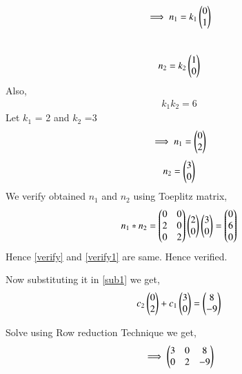 \documentclass[journal,12pt,twocolumn]{IEEEtran}
\begin{document}
\begin{align}
\implies n_1 = k_1\begin{pmatrix}0\\1\end{pmatrix}
\end{align}\\
\begin{align}
n_2 = k_2\begin{pmatrix}1\\0\end{pmatrix}
\end{align}
Also,
\begin{align}
k_1k_2 = 6
\end{align}
Let $k_1$ = 2 and $k_2$ =3
\begin{align}
\implies n_1 = \begin{pmatrix}0\\2\end{pmatrix}
\label{n1}
\end{align}
\begin{align}
n_2 = \begin{pmatrix}3\\0\end{pmatrix}
\label{n2}
\end{align}
We verify obtained $n_1$ and $n_2$ using Toeplitz matrix,
\begin{align}
n_1*n_2 = \begin{pmatrix}0&0\\2 &0\\0&2\end{pmatrix}\begin{pmatrix}2\\0\end{pmatrix}\begin{pmatrix}3\\0\end{pmatrix} = \begin{pmatrix}0\\6\\0\end{pmatrix}
\label{verify1}
\end{align}
Hence \eqref{verify} and \eqref{verify1} are same. Hence verified. 

Now substituting it in \eqref{sub1} we get,
\begin{align}
c_2\begin{pmatrix}0\\2\end{pmatrix}+c_1\begin{pmatrix}3\\0\end{pmatrix} = \begin{pmatrix}8\\-9\end{pmatrix}
\end{align}

Solve using Row reduction Technique we get,
\begin{align}
\implies\begin{pmatrix}3&0&8\\0&2&-9\end{pmatrix} 
\end{align}
\end{document}
